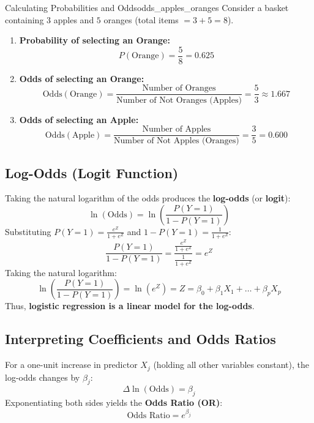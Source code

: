 \begin{example}{Calculating Probabilities and Odds}{odds_apples_oranges}
Consider a basket containing $3$ apples and $5$ oranges (total items $= 3 + 5 = 8$).

\begin{enumerate}
    \item \textbf{Probability of selecting an Orange:}
    \begin{equation}
    P(\text{Orange}) = \frac{5}{8} = 0.625
    \end{equation}

    \item \textbf{Odds of selecting an Orange:}
    \begin{equation}
    \text{Odds}(\text{Orange}) = \frac{\text{Number of Oranges}}{\text{Number of Not Oranges (Apples)}} = \frac{5}{3} \approx 1.667
    \end{equation}

    \item \textbf{Odds of selecting an Apple:}
    \begin{equation}
    \text{Odds}(\text{Apple}) = \frac{\text{Number of Apples}}{\text{Number of Not Apples (Oranges)}} = \frac{3}{5} = 0.600
    \end{equation}
\end{enumerate}
\end{example}

\subsection{Log-Odds (Logit Function)}
Taking the natural logarithm of the odds produces the \textbf{log-odds} (or \textbf{logit}):
\begin{equation}
\ln(\text{Odds}) = \ln\left(\frac{P(Y=1)}{1 - P(Y=1)}\right)
\end{equation}
Substituting $P(Y=1) = \frac{e^Z}{1 + e^Z}$ and $1 - P(Y=1) = \frac{1}{1 + e^Z}$:
\begin{equation}
\frac{P(Y=1)}{1 - P(Y=1)} = \frac{\frac{e^Z}{1+e^Z}}{\frac{1}{1+e^Z}} = e^Z
\end{equation}
Taking the natural logarithm:
\begin{equation}
\ln\left(\frac{P(Y=1)}{1 - P(Y=1)}\right) = \ln(e^Z) = Z = \beta_0 + \beta_1 X_1 + \dots + \beta_p X_p
\end{equation}
Thus, \textbf{logistic regression is a linear model for the log-odds}.

\subsection{Interpreting Coefficients and Odds Ratios}
For a one-unit increase in predictor $X_j$ (holding all other variables constant), the log-odds changes by $\beta_j$:
\begin{equation}
\Delta \ln(\text{Odds}) = \beta_j
\end{equation}
Exponentiating both sides yields the \textbf{Odds Ratio (OR)}:
\begin{equation}
\text{Odds Ratio} = e^{\beta_j}
\end{equation}

